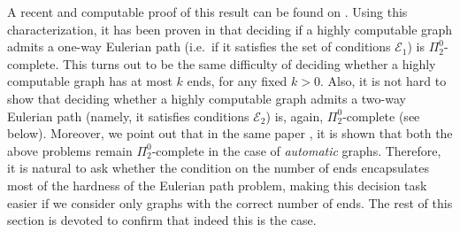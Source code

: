 \documentclass[10pt,A4]{amsart}
\theoremstyle{definition}
\theoremstyle{definition}
\newcommand{\eulerone}{\mathscr{E} _{1}}
\newcommand{\eulertwo}{\mathscr{E} _{2}}
\begin{document}
A recent and computable proof of this result can be found on \cite{nicanor-on-bean}. Using this characterization, it has been proven in \cite{Kuske-Lohrey} that deciding if a highly computable graph admits a one-way Eulerian path (i.e.~if it satisfies the set of conditions $\eulerone$) is $\Pi_2^0$-complete. This turns out to be the same difficulty of deciding whether a highly computable graph has at most $k$ ends, for any fixed $k > 0$. Also, it is not hard to show that deciding whether a highly computable graph admits a two-way Eulerian path (namely, it satisfies conditions $\eulertwo$) is, again, $\Pi_2^0$-complete (see  below). Moreover, we point out that in the same paper \cite{Kuske-Lohrey}, it is shown that both the above problems remain $\Pi_2^0$-complete in the case of \emph{automatic} graphs. Therefore, it is natural to ask whether the condition on the number of ends encapsulates most of the hardness of the Eulerian path problem, making this decision task easier if we consider only graphs with the correct number of ends. 
The rest of this section is devoted to confirm that indeed this is the case. 



\end{document}
